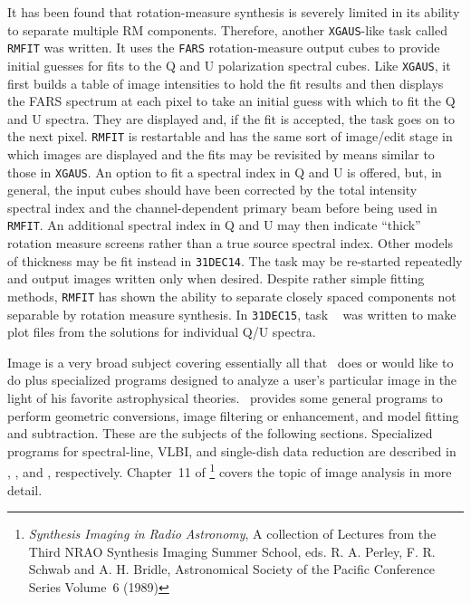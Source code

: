      It has been found that rotation-measure synthesis is severely
limited in its ability to separate multiple RM components.  Therefore,
another {\tt XGAUS}-like task called {\tt RMFIT} was written.  It uses
the {\tt FARS} rotation-measure output cubes to provide initial
guesses for fits to the Q and U polarization spectral cubes.  Like
{\tt XGAUS}, it first builds a table of image intensities to hold the
fit results and then displays the FARS spectrum at each pixel to take
an initial guess with which to fit the Q and U spectra.  They are
displayed and, if the fit is accepted, the task goes on to the next
pixel.  {\tt RMFIT} is restartable and has the same sort of image/edit
stage in which images are displayed and the fits may be revisited by
means similar to those in {\tt XGAUS}\@.  An option to fit a spectral
index in Q and U is offered, but, in general, the input cubes should
have been corrected by the total intensity spectral index and the
channel-dependent primary beam before being used in {\tt RMFIT}\@.  An
additional spectral index in Q and U may then indicate ``thick''
rotation measure screens rather than a true source spectral index.
Other models of thickness may be fit instead in {\tt 31DEC14}\@.  The
task may be re-started repeatedly and output images written only when
desired.  Despite rather simple fitting methods, {\tt RMFIT} has shown
the ability to separate closely spaced components not separable by
rotation measure synthesis.  In {\tt 31DEC15}, task {\tt
{}} was written to make plot files from the solutions for
individual Q/U spectra.

\vfill\eject
{}

     Image  is a very broad subject covering
essentially all that \AIPS\ does or would like to do plus specialized
programs designed to analyze a user's particular image in the light of
his favorite astrophysical theories.  \AIPS\ provides some general
programs to perform geometric conversions, image filtering or
enhancement, and model fitting and subtraction.  These are the
subjects of the following sections. Specialized programs for
spectral-line, VLBI, and single-dish data reduction are described in
, , and , respectively.  Chapter~11
of {\it {}\/}\footnote{{\it
Synthesis Imaging in Radio Astronomy\/}, A collection of Lectures from
the Third NRAO Synthesis Imaging Summer School, eds. R. A. Perley, F.
R. Schwab and A. H. Bridle, Astronomical Society of the Pacific
Conference Series Volume~6 (1989)} covers the topic of image analysis
in more detail.

